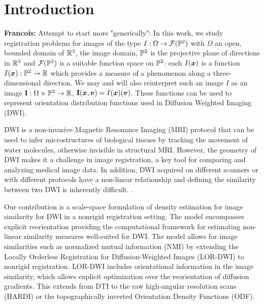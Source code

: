 \documentclass[twocolumn]{svjour3}
\newcommand{\francois}[1]{{\color{red}\textbf{Francois: }#1}}
\newcommand{\francois}[1]{{}}
\begin{document}
%



\section{Introduction}
\francois{Attempt to start more "generically":}
In this work, we study registration problems for images of the type $I:\Omega\to {\mathcal F}({\mathbb P}^2)$ with 
$\Omega$ an open, bounded domain of ${\mathbb R}^3$, the image domain, ${\mathbb P}^2$ is the projective plane of 
directions in ${\mathbb R}^3$ and ${\mathcal F}({\mathbb P}^2)$ is a suitable function space on ${\mathbb P}^2$: each $I(\boldsymbol{x})$ is a 
function  $I(\boldsymbol{x}):{\mathbb P}^2\to{\mathbb R}$ which provides a measure of a  phenomenon along a three-dimensional 
direction. We may and will also reinterpret such an image $I$ as an image 
${\bf I}:\Omega\times{\mathbb P}^2\to{\mathbb R}$, ${\bf I}(\boldsymbol{x}, \boldsymbol{v}) = I(\boldsymbol{x})(\boldsymbol{v})$. 
These functions can be used to represent orientation distribution functions used in Diffusion Weighted Imaging (DWI).

DWI is a non-invasive Magnetic Resonance Imaging (MRI) protocol that can
be used to infer microstructures of biological tissues by tracking the movement of water molecules, otherwise
invisible in structural MRI. However, the geometry of DWI makes it a challenge in image
registration, a key tool for comparing and analyzing medical image data. In addition, DWI
acquired on different scanners or with different protocols have a non-linear relationship
and defining the similarity between two DWI is inherently
difficult. \cite{johansen2013diffusion}.


Our contribution is a scale-space formulation of density estimation for image similarity
for DWI in a nonrigid registration setting. The model encompasses explicit reorientation
providing the computational framework for estimating non-linear similarity measures
well-suited for DWI. The model allows for image similarities such as normalized mutual
information (NMI) by extending the Locally Orderless Registration for Diffusion-Weighted
Images (LOR-DWI) \cite{jensen2015locally} to nonrigid registration. LOR-DWI includes
orientational information in the image similarity, which allows explicit optimization over
the reorientation of diffusion gradients. This extends from DTI to the raw high-angular
resolution scans (HARDI) or the topographically inverted Orientation Density Functions
(ODF).
\end{document}
